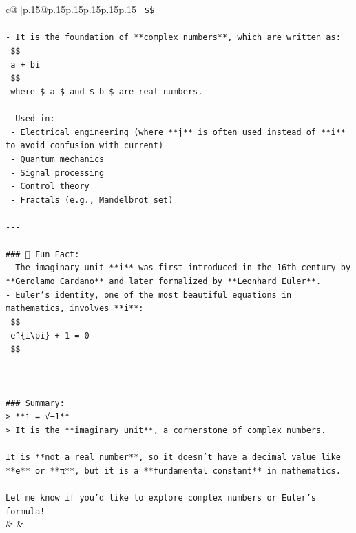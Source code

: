 \documentclass{article}
\begin{document}
{\begin{supertabular}{c@{$\;$}|p{.15\linewidth}@{}p{.15\linewidth}p{.15\linewidth}p{.15\linewidth}p{.15\linewidth}p{.15\linewidth}}
{{{\texttt{  \$\$} \\
\\ 
\texttt{{-} It is the foundation of **complex numbers**, which are written as:} \\
\texttt{  \$\$} \\
\texttt{  a + bi} \\
\texttt{  \$\$} \\
\texttt{  where \$ a \$ and \$ b \$ are real numbers.} \\
\\ 
\texttt{{-} Used in:} \\
\texttt{  {-} Electrical engineering (where **j** is often used instead of **i** to avoid confusion with current)} \\
\texttt{  {-} Quantum mechanics} \\
\texttt{  {-} Signal processing} \\
\texttt{  {-} Control theory} \\
\texttt{  {-} Fractals (e.g., Mandelbrot set)} \\
\\ 
\texttt{{-}{-}{-}} \\
\\ 
\texttt{\#\#\# 🧠 Fun Fact:} \\
\texttt{{-} The imaginary unit **i** was first introduced in the 16th century by **Gerolamo Cardano** and later formalized by **Leonhard Euler**.} \\
\texttt{{-} Euler's identity, one of the most beautiful equations in mathematics, involves **i**:} \\
\texttt{  \$\$} \\
\texttt{  e\^{}\{i\textbackslash{}pi\} + 1 = 0} \\
\texttt{  \$\$} \\
\\ 
\texttt{{-}{-}{-}} \\
\\ 
\texttt{\#\#\# Summary:} \\
\texttt{> **i = √−1**  } \\
\texttt{> It is the **imaginary unit**, a cornerstone of complex numbers.} \\
\\ 
\texttt{It is **not a real number**, so it doesn't have a decimal value like **e** or **π**, but it is a **fundamental constant** in mathematics.} \\
\\ 
\texttt{Let me know if you'd like to explore complex numbers or Euler's formula!} \\
            }
        }
    }
    & & \\ \\


\end{supertabular}}
\end{document}
